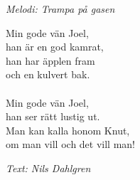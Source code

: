 {\footnotesize\textit{Melodi: Trampa på gasen}}\par
\vspace{10pt}
Min gode vän Joel,\\
han är en god kamrat,\\
han har äpplen fram\\
och en kulvert bak.\\
\\
Min gode vän Joel,\\
han ser rätt lustig ut.\\
Man kan kalla honom Knut,\\
om man vill och det vill man!
\par
\vspace{10pt}
{\footnotesize\textit{Text: Nils Dahlgren}}